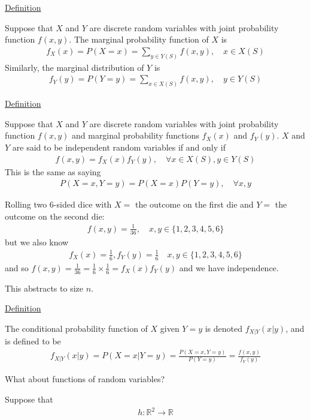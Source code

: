 \documentclass{article}
\begin{document}
\underline{Definition}

Suppose that $X$ and $Y$ are discrete random variables with joint probability function $f(x,y)$. The marginal probability function of $X$ is
\begin{align*}
    f_X(x) = P(X = x) = \sum_{y \in Y(S)}f(x,y), \quad x \in X(S)
\end{align*}
Similarly, the marginal distribution of $Y$ is
\begin{align*}
    f_Y(y) = P(Y = y) = \sum_{x \in X(S)} f(x,y), \quad y \in Y(S)
\end{align*}

\underline{Definition}

Suppose that $X$ and $Y$ are discrete random variables with joint probability function $f(x,y)$ and marginal probability functions $f_X(x)$ and $f_Y(y)$. $X$ and $Y$ are said to be independent random variables if and only if 
\begin{align*}
    f(x,y) = f_X(x)f_Y(y), \quad  \forall x \in X(S), y \in Y(S)
\end{align*}
This is the same as saying
\begin{align*}
    P(X=x, Y=y) = P(X=x)P(Y=y), \quad \forall x,y
\end{align*}


Rolling two 6-sided dice with $X = $ the outcome on the first die and $Y = $ the outcome on the second die: 
\begin{align*}
    f(x,y) = \frac{1}{36}, \quad x,y \in \{1,2,3,4,5,6\}
\end{align*}
but we also know
\begin{align*}
    f_X(x) = \frac{1}{6}, f_Y(y) = \frac{1}{6} \quad x,y \in \{1,2,3,4,5,6\}
\end{align*}
and so $f(x,y) = \frac{1}{36} = \frac{1}{6} \times \frac{1}{6} = f_X(x)f_Y(y)$ and we have independence. 

This abstracts to size $n$. 

\underline{Definition}

The conditional probability function of $X$ given $Y = y$ is denoted $f_{X \vert Y}(x \vert y)$, and is defined to be
\begin{align*}
    f_{X \vert Y}(x \vert y) = P( X = x \vert Y = y) = \frac{P(X = x, Y=y)}{P(Y=y)} = \frac{f(x,y)}{f_Y(y)}
\end{align*}

What about functions of random variables?

Suppose that
\begin{align*}
    h : \mathbb{R}^2 \to \mathbb{R}
\end{align*}
\end{document}
